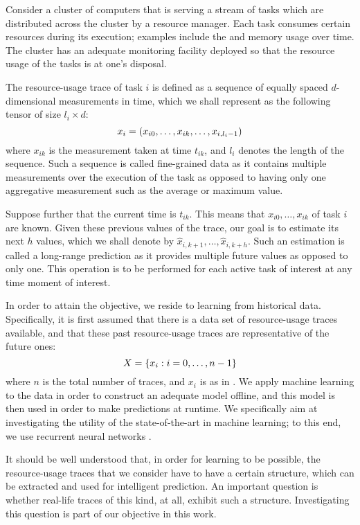 Consider a cluster of computers that is serving a stream of tasks which are
distributed across the cluster by a resource manager. Each task consumes certain
resources during its execution; examples include the  and memory usage
over time. The cluster has an adequate monitoring facility deployed so that the
resource usage of the tasks is at one's disposal.

The resource-usage trace of task $i$ is defined as a sequence of equally spaced
$d$-dimensional measurements in time, which we shall represent as the following
tensor of size $l_i \times d$:
\begin{equation} \elab{trace}
  x_i = \left(x_{i0}, \dots, x_{ik}, \dots, x_{i,l_i - 1}\right)
\end{equation}
where $x_{ik}$ is the measurement taken at time $t_{ik}$, and $l_i$ denotes the
length of the sequence. Such a sequence is called fine-grained data as it
contains multiple measurements over the execution of the task as opposed to
having only one aggregative measurement such as the average or maximum value.

Suppose further that the current time is $t_{ik}$. This means that $x_{i0},
\dots, x_{ik}$ of task $i$ are known. Given these previous values of the trace,
our goal is to estimate its next $h$ values, which we shall denote by
$\hat{x}_{i,k + 1}, \dots, \hat{x}_{i,k + h}$. Such an estimation is called a
long-range prediction as it provides multiple future values as opposed to only
one. This operation is to be performed for each active task of interest at any
time moment of interest.

In order to attain the objective, we reside to learning from historical data.
Specifically, it is first assumed that there is a data set of resource-usage
traces available, and that these past resource-usage traces are representative
of the future ones:
\begin{equation} \elab{traces}
  X = \{ x_i: i = 0, \dots, n - 1 \}
\end{equation}
where $n$ is the total number of traces, and $x_i$ is as in . We
apply machine learning to the data in order to construct an adequate model
offline, and this model is then used in order to make predictions at runtime. We
specifically aim at investigating the utility of the state-of-the-art in machine
learning; to this end, we use recurrent neural networks \cite{goodfellow2016}.

It should be well understood that, in order for learning to be possible, the
resource-usage traces that we consider have to have a certain structure, which
can be extracted and used for intelligent prediction. An important question is
whether real-life traces of this kind, at all, exhibit such a structure.
Investigating this question is part of our objective in this work.

